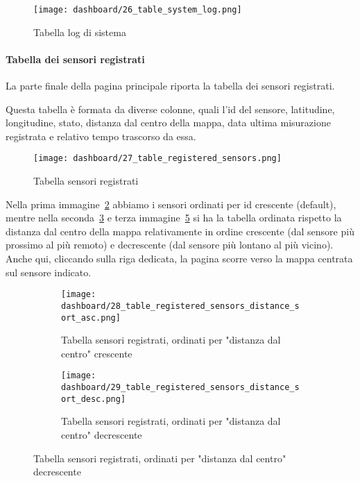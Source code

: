 \begin{figure}[H]
  \centering
  \texttt{[image: dashboard/26\_table\_system\_log.png]}
  \caption{Tabella log di sistema}
  \label{fig:app-tab-system-log}
\end{figure}

\newpage

\paragraph{Tabella dei sensori registrati}

La parte finale della pagina principale riporta la tabella dei sensori registrati.

Questa tabella è formata da diverse colonne, quali l'id del sensore, latitudine, longitudine, stato,
distanza dal centro della mappa, data ultima misurazione registrata e relativo tempo trascorso da essa.

\begin{figure}[H]
  \centering
  \texttt{[image: dashboard/27\_table\_registered\_sensors.png]}
  \caption{Tabella sensori registrati}
  \label{fig:app-tab-registered-sensors}
\end{figure}

Nella prima immagine~\ref{fig:app-tab-registered-sensors} abbiamo i sensori ordinati per id crescente (default),
mentre nella seconda~\ref{fig:app-tab-registered-sensors-distance-sort-asc} e
terza immagine~\ref{fig:app-tab-registered-sensors-distance-sort-desc} si ha la tabella ordinata rispetto
la distanza dal centro della mappa relativamente in ordine crescente (dal sensore più prossimo al più remoto) e
decrescente (dal sensore più lontano al più vicino).
Anche qui, cliccando sulla riga dedicata, la pagina scorre verso la mappa centrata sul sensore indicato.

\begin{figure}[H]
  \centering
  \begin{subfigure}{\textwidth}
    \centering
    \texttt{[image: dashboard/28\_table\_registered\_sensors\_distance\_sort\_asc.png]}
    \caption{Tabella sensori registrati, ordinati per "distanza dal centro" crescente}
    \label{fig:app-tab-registered-sensors-distance-sort-asc}
  \end{subfigure}

  \hfill
  \begin{subfigure}{\textwidth}
    \centering
    \texttt{[image: dashboard/29\_table\_registered\_sensors\_distance\_sort\_desc.png]}
    \caption{Tabella sensori registrati, ordinati per "distanza dal centro" decrescente}
    \label{fig:app-tab-registered-sensors-distance-sort-desc}
  \end{subfigure}
\end{figure}

